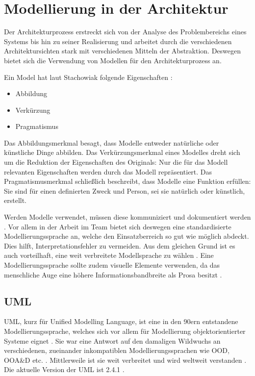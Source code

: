 \chapter{Modellierung in der Architektur}
Der Architekturprozess \glqq erstreckt sich von der Analyse des Problembereichs eines Systems bis hin zu seiner Realisierung\grqq \cite[S. 10]{softarch} und arbeitet durch die verschiedenen Architektursichten stark mit verschiedenen Mitteln der Abstraktion. Deswegen bietet sich die Verwendung von Modellen für den Architekturprozess an.

Ein Model hat laut Stachowiak folgende Eigenschaften \cite[S. 131-133]{modell}:

\begin{itemize}
  \item Abbildung
  \item Verkürzung
  \item Pragmatismus
\end{itemize}

Das Abbildungsmerkmal besagt, dass Modelle entweder natürliche oder künstliche Dinge abbilden. Das Verkürzungsmerkmal eines Modelles dreht sich um die Reduktion der Eigenschaften des Originals: Nur die für das Modell relevanten Eigenschaften werden durch das Modell repräsentiert. Das Pragmatismusmerkmal schließlich beschreibt, dass Modelle eine Funktion erfüllen: Sie sind für einen definierten Zweck und Person, sei sie natürlich oder künstlich, erstellt. \cite[S. 131-133]{modell}

Werden Modelle verwendet, müssen diese kommuniziert und dokumentiert werden \cite[S. 12]{reqanalysis}. Vor allem in der Arbeit im Team bietet sich deswegen eine standardisierte Modellierungssprache an, welche den Einsatzberreich so gut wie möglich abdeckt. Dies hilft, Interpretationsfehler zu vermeiden. Aus dem gleichen Grund ist es auch vorteilhaft, eine weit verbreitete Modellsprache zu wählen \cite[S. 139]{effektiv}. Eine Modellierungssprache sollte zudem visuelle Elemente verwenden, da das menschliche Auge eine höhere Informationsbandbreite als Prosa besitzt \cite[S. 12]{reqanalysis}.

\section{UML}
UML, kurz für Unified Modelling Language, ist eine in den 90ern entstandene Modellierungssprache, welches sich vor allem für Modellierung objektorientierter Systeme eignet \cite[S. 145]{basiswissen}. Sie war eine Antwort auf den damaligen Wildwuchs an verschiedenen, zueinander inkompatiblen Modellierungssprachen wie OOD, OOA\&D etc. \cite[S. 5]{glasklar}. Mittlerweile ist sie weit verbreitet und wird weltweit verstanden \cite[S. 138]{effektiv}. Die aktuelle Version der UML ist 2.4.1 \cite{omg}.


